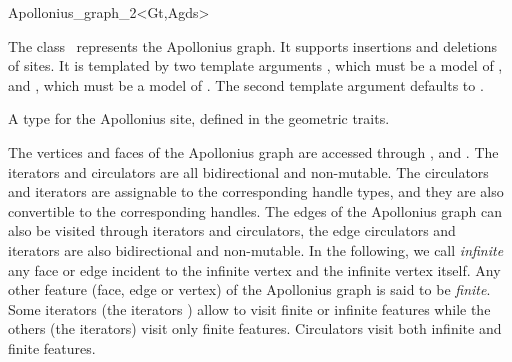 

\begin{ccRefClass}{Apollonius_graph_2<Gt,Agds>}

\ccDefinition

The class \ccRefName\ represents the
Apollonius graph. It supports insertions and deletions of sites.
It is templated by two template arguments , which
must be a model of , and ,
which must be a model of .
The second template argument defaults to
.


\ccTypes

%
\ccGlue
{}
\ccGlue
{}
\ccGlue
{}
{A type for the Apollonius site, defined in the geometric traits.}
\ccGlue
%


The vertices and faces of the Apollonius graph are accessed
through , 
 and . 
The iterators and circulators
are all bidirectional and non-mutable.
The circulators and iterators are assignable to the 
corresponding handle types, and they are also convertible to the
corresponding handles.
The edges of the Apollonius graph can also be visited through iterators
and circulators,
the edge circulators and iterators
are also bidirectional and non-mutable.
In the following, we call {\it infinite} any face or edge 
incident  to the infinite vertex and the infinite vertex itself.
Any other feature (face, edge or vertex) of the Apollonius graph is said 
to be {\it finite}.
Some iterators (the  iterators ) allow to visit finite or 
infinite features while the others (the  iterators) visit only
finite features. Circulators visit both infinite and finite features.


\end{ccRefClass}
